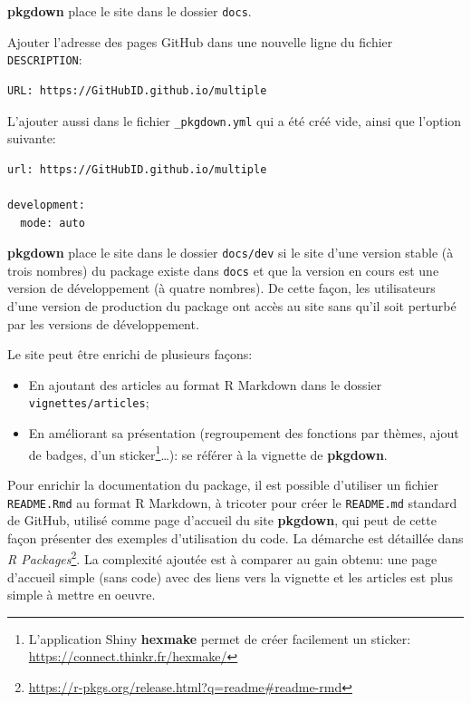 \documentclass[
  11pt,
  french,
  a4paper,
  extrafontsizes,onecolumn,openright
  ]{memoir}
\providecommand{\tightlist}{%
  \setlength{\itemsep}{0pt}\setlength{\parskip}{0pt}}
\begin{document}
\textbf{pkgdown} place le site dans le dossier \texttt{docs}.

Ajouter l'adresse des pages GitHub dans une nouvelle ligne du fichier \texttt{DESCRIPTION}:

\begin{verbatim}
URL: https://GitHubID.github.io/multiple
\end{verbatim}

L'ajouter aussi dans le fichier \texttt{\_pkgdown.yml} qui a été créé vide, ainsi que l'option suivante:

\begin{verbatim}
url: https://GitHubID.github.io/multiple

development:
  mode: auto
\end{verbatim}

\textbf{pkgdown} place le site dans le dossier \texttt{docs/dev} si le site d'une version stable (à trois nombres) du package existe dans \texttt{docs} et que la version en cours est une version de développement (à quatre nombres).
De cette façon, les utilisateurs d'une version de production du package ont accès au site sans qu'il soit perturbé par les versions de développement.

Le site peut être enrichi de plusieurs façons:

\begin{itemize}
\tightlist
\item
  En ajoutant des articles au format R Markdown dans le dossier \texttt{vignettes/articles};
\item
  En améliorant sa présentation (regroupement des fonctions par thèmes, ajout de badges, d'un sticker\footnote{L'application Shiny \textbf{hexmake} permet de créer facilement un sticker: \url{https://connect.thinkr.fr/hexmake/}}\ldots): se référer à la vignette de \textbf{pkgdown}.
\end{itemize}

Pour enrichir la documentation du package, il est possible d'utiliser un fichier \texttt{README.Rmd} au format R Markdown, à tricoter pour créer le \texttt{README.md} standard de GitHub, utilisé comme page d'accueil du site \textbf{pkgdown}, qui peut de cette façon présenter des exemples d'utilisation du code.
La démarche est détaillée dans \emph{R Packages}\footnote{\url{https://r-pkgs.org/release.html?q=readme\#readme-rmd}}.
La complexité ajoutée est à comparer au gain obtenu: une page d'accueil simple (sans code) avec des liens vers la vignette et les articles est plus simple à mettre en oeuvre.
\end{document}
